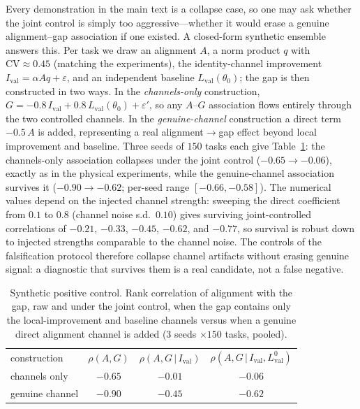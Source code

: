\documentclass[aps,pra,onecolumn,superscriptaddress,10pt]{revtex4-2}
\newcommand{\CV}{\mathrm{CV}}
\newcommand{\Ival}{I_{\mathrm{val}}}
\newcommand{\thetaz}{\theta_0}
\newcommand{\Lval}{L_{\mathrm{val}}}
\begin{document}
Every demonstration in the main text is a collapse case, so one may ask whether the joint control is
simply too aggressive---whether it would erase a genuine alignment--gap association if one existed.
A closed-form synthetic ensemble answers this. Per task we draw an alignment $A$, a norm product $q$
with $\CV\approx0.45$ (matching the experiments), the identity-channel improvement
$\Ival=\alpha A q+\varepsilon$, and an independent baseline $\Lval(\thetaz)$; the gap is then
constructed in two ways. In the \emph{channels-only} construction,
$G=-0.8\,\Ival+0.8\,\Lval(\thetaz)+\varepsilon'$, so any $A$--$G$ association flows entirely through
the two controlled channels. In the \emph{genuine-channel} construction a direct term $-0.5\,A$ is
added, representing a real alignment$\to$gap effect beyond local improvement and baseline. Three
seeds of $150$ tasks each give Table~\ref{tab:positive}: the channels-only association collapses
under the joint control ($-0.65\to-0.06$), exactly as in the physical experiments, while the
genuine-channel association survives it ($-0.90\to-0.62$; per-seed range $[-0.66,-0.58]$). The numerical values depend on the injected channel strength: sweeping the direct coefficient from
$0.1$ to $0.8$ (channel noise s.d.\ $0.10$) gives surviving joint-controlled correlations of $-0.21$,
$-0.33$, $-0.45$, $-0.62$, and $-0.77$, so survival is robust down to injected strengths comparable
to the channel noise. The
controls of the falsification protocol therefore collapse channel artifacts without erasing genuine
signal: a diagnostic that survives them is a real candidate, not a false negative.

\begin{table}[h]
\caption{\label{tab:positive}%
Synthetic positive control. Rank correlation of alignment with the gap, raw and under the joint
control, when the gap contains only the local-improvement and baseline channels versus when a
genuine direct alignment channel is added ($3$ seeds $\times150$ tasks, pooled).}
\begin{ruledtabular}
\begin{tabular}{lccc}
construction & $\rho(A,G)$ & $\rho(A,G\,|\,\Ival)$ & $\rho(A,G\,|\,\Ival,\Lval^{0})$ \\
\colrule
channels only    & $-0.65$ & $-0.01$ & $-0.06$ \\
genuine channel  & $-0.90$ & $-0.45$ & $-0.62$ \\
\end{tabular}
\end{ruledtabular}
\end{table}
\end{document}
